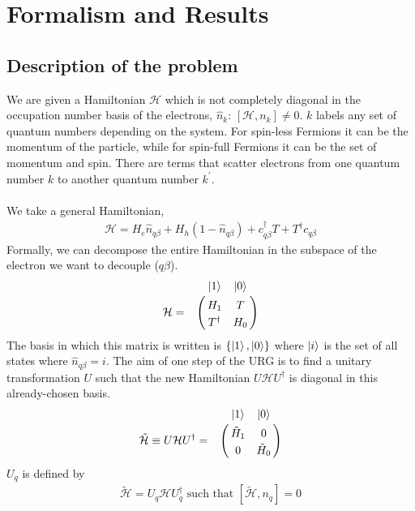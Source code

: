 \documentclass[twoside,11pt]{report}
\numberwithin{equation}{section}
\begin{document}
\section{Formalism and Results}
\subsection{Description of the problem}
We are given a Hamiltonian \(\mathcal{H}\) which is not completely diagonal in the occupation number basis of the electrons, \(\hat n_k\): \(\left[\mathcal{H},n_k\right] \neq 0\). \(k\) labels any set of quantum numbers depending on the system. For spin-less Fermions it can be the momentum of the particle, while for spin-full Fermions it can be the set of momentum and spin. There are terms that scatter electrons from one quantum number \(k\) to another quantum number \(k^\prime\).
\\\\We take a general Hamiltonian,
\begin{equation}\begin{aligned}
	\mathcal{H} = H_e \hat n_{q\beta} + H_h \left(1 - \hat n_{q\beta}\right) + c^\dagger_{q\beta}T + T^\dagger c_{q\beta}
\end{aligned}\end{equation}
Formally, we can decompose the entire Hamiltonian in the subspace of the electron we want to decouple (\(q\beta\)).
\begin{equation}\begin{aligned}
	\label{matham}
\mathcal{H} = \bordermatrix{~ & \ket{1} & \ket{0} \cr
              & H_1 & T \cr
              & T^\dagger & H_0 \cr}
\end{aligned}\end{equation}
The basis in which this matrix is written is \(\left\{\ket{1},\ket{0}\right\}\) where \(\ket{i}\) is the set of all states where \(\hat n_{q\beta}=i\). The aim of one step of the URG is to find a unitary transformation \(U\) such that the new Hamiltonian \(U \mathcal{H} U^\dagger\) is diagonal in this already-chosen basis.
\begin{equation}\begin{aligned}
	\tilde{\mathcal{H}} \equiv U \mathcal{H} U^\dagger = \bordermatrix{~ & \ket{1} & \ket{0} \cr
              & \tilde H_1 & 0 \cr
              & 0 & \tilde H_0 \cr}
\end{aligned}\end{equation}
\(U_q\) is defined by
\begin{equation}\begin{aligned}
	\tilde{\mathcal{H}} = U_q \mathcal{H} U^\dagger_q \text{   such that  } \left[\tilde{\mathcal{H}},n_q\right] = 0
\end{aligned}\end{equation}
\end{document}
